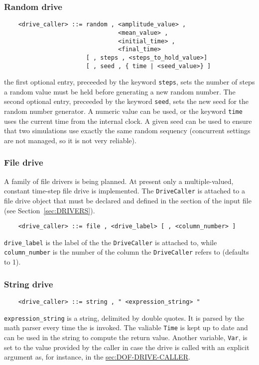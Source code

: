 \subsubsection{Random drive}
\begin{verbatim}
    <drive_caller> ::= random , <amplitude_value> ,
                                <mean_value> ,
                                <initial_time> ,
                                <final_time> 
                       [ , steps , <steps_to_hold_value>]
                       [ , seed , { time | <seed_value>} ]
\end{verbatim}
the first optional entry, preceeded by the keyword \texttt{steps}, sets the
number of steps a random value must be held before generating a new
random number. The second optional entry, preceeded by the keyword
\texttt{seed}, sets the new seed for the random number generator. A numeric
value can be used, or the keyword \texttt{time} uses the current time from
the internal clock. A given seed can be used to ensure that two
simulations use exactly the same random sequency (concurrent settings 
are not managed, so it is not very reliable).

\subsubsection{File drive}
A family of file drivers is being planned.
At present only a multiple-valued, constant time-step file drive is
implemented.
The \texttt{DriveCaller} is attached to a file drive object that must be declared
and defined in the  section 
of the input file (see Section~\ref{sec:DRIVERS}).
\begin{verbatim}
    <drive_caller> ::= file , <drive_label> [ , <column_number> ]
\end{verbatim}
\texttt{drive\_label} is the label of the  
the \texttt{DriveCaller} is attached to, while
\texttt{column\_number} is the number of the column the \texttt{DriveCaller}
refers to (defaults to 1).

\subsubsection{String drive}
\begin{verbatim}
    <drive_caller> ::= string , " <expression_string> "
\end{verbatim}
\texttt{expression\_string} is a string, delimited by double quotes.
It is parsed by the math parser every time 
the  is invoked.
The valiable \texttt{Time} is kept up to date and can be used in the 
string to compute the return value.
Another variable, \texttt{Var}, is set to the value provided by the caller
in case the drive is called with an explicit argument as, for instance,
in the \hyperref{dof drive}{dof drive (see Section~}{)}{sec:DOF-DRIVE-CALLER}.

